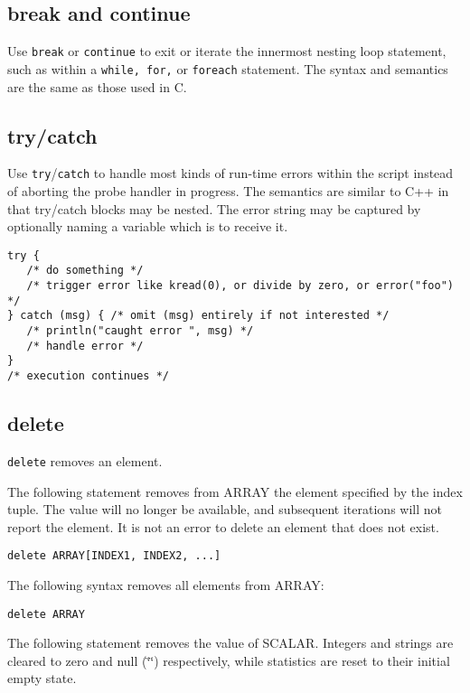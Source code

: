 \documentclass[twoside,english]{article}
\newenvironment{vindent}
{\begin{list}{}{\setlength{\listparindent}{6pt}}
\item[]}
{\end{list}}
\begin{document}
\subsection{break and continue}
Use \texttt{break} or \texttt{continue} to exit or iterate the innermost
nesting loop statement, such as within a \texttt{while, for,} or \texttt{foreach}
statement. The syntax and semantics are the same as those used in C.


\subsection{try/catch}
Use \texttt{try}/\texttt{catch} to handle most kinds of run-time errors within the script
instead of aborting the probe handler in progress.  The semantics are similar
to C++ in that try/catch blocks may be nested.  The error string may be captured
by optionally naming a variable which is to receive it.

\begin{vindent}
\begin{verbatim}
try { 
   /* do something */
   /* trigger error like kread(0), or divide by zero, or error("foo") */
} catch (msg) { /* omit (msg) entirely if not interested */
   /* println("caught error ", msg) */
   /* handle error */
}
/* execution continues */
\end{verbatim}
\end{vindent}


\subsection{delete\label{sub:delete}}
\texttt{delete} removes an element.

The following statement removes from ARRAY the element specified by the index
tuple. The value will no longer be available, and subsequent iterations will
not report the element. It is not an error to delete an element that does
not exist.

\begin{vindent}
\begin{verbatim}
delete ARRAY[INDEX1, INDEX2, ...]
\end{verbatim}
\end{vindent}
The following syntax removes all elements from ARRAY:

\begin{vindent}
\begin{verbatim}
delete ARRAY
\end{verbatim}
\end{vindent}
The following statement removes the value of SCALAR. Integers and strings
are cleared to zero and null (\char`\"{}\char`\"{}) respectively, while statistics
are reset to their initial empty state.
\end{document}
